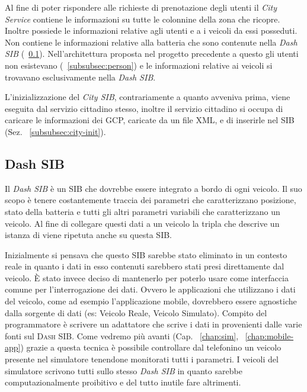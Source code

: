 Al fine di poter rispondere alle richieste di prenotazione degli utenti il \emph{City Service} contiene le informazioni su tutte le colonnine della zona che ricopre. Inoltre possiede le informazioni relative agli utenti e a i veicoli da essi posseduti. Non contiene le informazioni relative alla batteria che sono contenute nella \emph{Dash SIB} (~\ref{subsec:dash-sib}). Nell'architettura proposta nel progetto precedente a questo gli utenti non esistevano (~\ref{subsubsec:person}) e le informazioni relative ai veicoli si trovavano esclusivamente nella \emph{Dash SIB}.

L'inizializzazione del \emph{City SIB}, contrariamente a quanto avveniva prima, viene eseguita dal servizio cittadino stesso, inoltre il servizio cittadino si occupa di caricare le informazioni dei GCP, caricate da un file XML, e di inserirle nel SIB (Sez. ~\ref{subsubsec:city-init}).


\subsection{Dash SIB}\label{subsec:dash-sib}

Il \emph{Dash SIB} è  un SIB che dovrebbe essere integrato a bordo di ogni veicolo. Il suo scopo è tenere costantemente traccia dei parametri che caratterizzano posizione, stato della batteria e tutti gli altri parametri variabili che caratterizzano un veicolo. Al fine di collegare questi dati a un veicolo la tripla che descrive un istanza di  viene ripetuta anche su questa SIB. 

Inizialmente si pensava che questo SIB sarebbe stato eliminato in un contesto reale in quanto i dati in esso contenuti sarebbero stati presi direttamente dal veicolo. È stato invece deciso di mantenerlo per poterlo usare come interfaccia comune per l'interrogazione dei dati. Ovvero le applicazioni che utilizzano i dati del veicolo, come ad esempio l'applicazione mobile, dovrebbero essere agnostiche dalla sorgente di dati (es: Veicolo Reale, Veicolo Simulato). Compito del programmatore è scrivere un adattatore che scrive i dati in provenienti dalle varie fonti sul \textsc{Dash SIB}. Come vedremo più avanti (Cap. ~\ref{chap:sim}, ~\ref{chap:mobile-app}) grazie a questa tecnica è possibile controllare dal telefonino un veicolo presente nel simulatore tenendone monitorati tutti i parametri. I veicoli del simulatore scrivono tutti sullo stesso \emph{Dash SIB} in quanto sarebbe computazionalmente proibitivo e del tutto inutile fare altrimenti.

